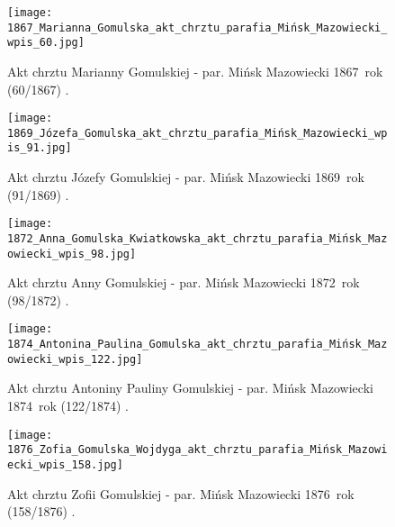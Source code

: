 \begin{figure}[!ht]
    \vspace*{0.5cm}
    \centering \texttt{[image: 
        1867\_Marianna\_Gomulska\_akt\_chrztu\_parafia\_Mińsk\_Mazowiecki\_wpis\_60.jpg]}
    \captionsetup{format=hang}
    \caption{Akt chrztu Marianny Gomulskiej - par. Mińsk Mazowiecki 1867~rok (60/1867) 
    \cite{par_minsk2}.}
    \label{fig:mgomulska_1867}
\end{figure}

\begin{figure}[!ht]
    \vspace*{0.5cm}
    \centering \texttt{[image: 
        1869\_Józefa\_Gomulska\_akt\_chrztu\_parafia\_Mińsk\_Mazowiecki\_wpis\_91.jpg]}
    \captionsetup{format=hang}
    \caption{Akt chrztu Józefy Gomulskiej - par. Mińsk Mazowiecki 1869~rok (91/1869) 
    \cite{par_minsk2}.}
    \label{fig:jgomulska_1869}
\end{figure}

\begin{figure}[!ht]
    \vspace*{0.5cm}
    \centering \texttt{[image: 
        1872\_Anna\_Gomulska\_Kwiatkowska\_akt\_chrztu\_parafia\_Mińsk\_Mazowiecki\_wpis\_98.jpg]}
    \captionsetup{format=hang}
    \caption{Akt chrztu Anny Gomulskiej - par. Mińsk Mazowiecki 1872~rok (98/1872) 
    \cite{par_minsk2}.}
    \label{fig:agomulska_1872}
\end{figure}

\begin{figure}[!ht]
    \vspace*{0.5cm}
    \centering \texttt{[image: 
        1874\_Antonina\_Paulina\_Gomulska\_akt\_chrztu\_parafia\_Mińsk\_Mazowiecki\_wpis\_122.jpg]}
    \captionsetup{format=hang}
    \caption{Akt chrztu Antoniny Pauliny Gomulskiej - par. Mińsk Mazowiecki
    1874~rok (122/1874) 
    \cite{par_minsk2}.}
    \label{fig:apgomulska_1874}
\end{figure}

\begin{figure}[!ht]
    \vspace*{0.5cm}
    \centering \texttt{[image: 
        1876\_Zofia\_Gomulska\_Wojdyga\_akt\_chrztu\_parafia\_Mińsk\_Mazowiecki\_wpis\_158.jpg]}
    \captionsetup{format=hang}
    \caption{Akt chrztu Zofii Gomulskiej - par. Mińsk Mazowiecki 1876~rok (158/1876) 
    \cite{par_minsk2}.}
    \label{fig:zgomulska_1876}
\end{figure}

